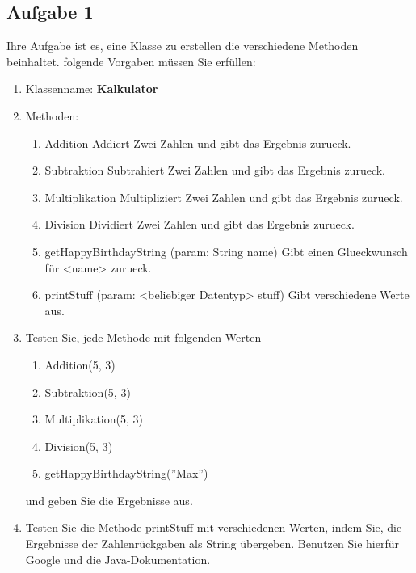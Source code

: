 \documentclass[12pt, a4paper]{article}
\begin{document}
\subsection*{Aufgabe 1}
Ihre Aufgabe ist es, eine Klasse zu erstellen die verschiedene Methoden beinhaltet. folgende Vorgaben müssen Sie erfüllen:
\begin{enumerate}[label=$\alph*)$]
    \item Klassenname: \textbf{Kalkulator}
    \item Methoden:
    \begin{enumerate}
        \item Addition
        \subsubitem Addiert Zwei Zahlen und gibt das Ergebnis zurueck.
        \item Subtraktion
        \subsubitem Subtrahiert Zwei Zahlen und gibt das Ergebnis zurueck.
        \item Multiplikation
        \subsubitem Multipliziert Zwei Zahlen und gibt das Ergebnis zurueck.
        \item Division
        \subsubitem Dividiert Zwei Zahlen und gibt das Ergebnis zurueck.
        \item getHappyBirthdayString (param: String name)
        \subsubitem Gibt einen Glueckwunsch für <name> zurueck.
        \item printStuff (param: <beliebiger Datentyp> stuff)
        \subsubitem Gibt verschiedene Werte aus.
    \end{enumerate} 
    \item Testen Sie, jede Methode mit folgenden Werten
    \begin{enumerate}
        \item Addition(5, 3)
        \item Subtraktion(5, 3)
        \item Multiplikation(5, 3)
        \item Division(5, 3)
        \item getHappyBirthdayString(''Max'')
    \end{enumerate}
    und geben Sie die Ergebnisse aus.
    \item Testen Sie die Methode printStuff mit verschiedenen Werten, indem Sie, die Ergebnisse der Zahlenrückgaben als String übergeben. Benutzen Sie hierfür Google und die Java-Dokumentation.
\end{enumerate}
\newpage
\end{document}
